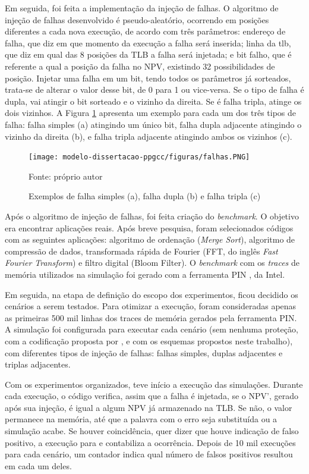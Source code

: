 Em seguida, foi feita a implementação da injeção de falhas. O algoritmo de injeção de falhas desenvolvido é pseudo-aleatório, ocorrendo em posições diferentes a cada nova execução, de acordo com três parâmetros: endereço de falha, que diz em que momento da execução a falha será inserida; linha da tlb, que diz em qual das 8 posições da TLB a falha será injetada; e bit falho, que é referente a qual a posição da falha no NPV, existindo 32 possibilidades de posição. Injetar uma falha em um bit, tendo todos os parâmetros já sorteados, trata-se de alterar o valor desse bit, de 0 para 1 ou vice-versa. Se o tipo de falha é dupla, vai atingir o bit sorteado e o vizinho da direita. Se é falha tripla, atinge os dois vizinhos. A Figura \ref{fig:falhas} apresenta um exemplo para cada um dos três tipos de falha: falha simples (a) atingindo um único bit, falha dupla adjacente atingindo o vizinho da direita (b), e falha tripla adjacente atingindo ambos os vizinhos (c).

\begin{figure}[ht]
    \centering
    \texttt{[image: modelo-dissertacao-ppgcc/figuras/falhas.PNG]}
    \caption{Exemplos de falha simples (a), falha dupla (b) e falha tripla (c)}{Fonte: próprio autor}
    \label{fig:falhas}
\end{figure}

Após o algoritmo de injeção de falhas, foi feita criação do \textit{benchmark}. O objetivo era encontrar aplicações reais. Após breve pesquisa, foram selecionados códigos com as seguintes aplicações: algoritmo de ordenação (\textit{Merge Sort}), algoritmo de compressão de dados, transformada rápida de Fourier (FFT, do inglês \textit{Fast Fourier Transform}) e filtro digital (Bloom Filter). O \textit{benchmark} com os \textit{traces} de memória utilizados na simulação foi gerado com a ferramenta PIN \cite{luk2005pin}, da Intel.

Em seguida, na etapa de definição do escopo dos experimentos, ficou decidido os cenários a serem testados. Para otimizar a execução, foram consideradas apenas as primeiras 500 mil linhas dos traces de memória gerados pela ferramenta PIN. A simulação foi configurada para executar cada cenário (sem nenhuma proteção, com a codificação proposta por \cite{sanchez2019reducing}, e com os esquemas propostos neste trabalho), com diferentes tipos de injeção de falhas: falhas simples, duplas adjacentes e triplas adjacentes.

Com os experimentos organizados, teve início a execução das simulações. Durante cada execução, o código verifica, assim que a falha é injetada, se o NPV', gerado após sua injeção, é igual a algum NPV já armazenado na TLB. Se não, o valor permanece na memória, até que a palavra com o erro seja substituída ou a simulação acabe. Se houver coincidência, quer dizer que houve indicação de falso positivo, a execução para e contabiliza a ocorrência. Depois de 10 mil execuções para cada cenário, um contador indica qual número de falsos positivos resultou em cada um deles.

